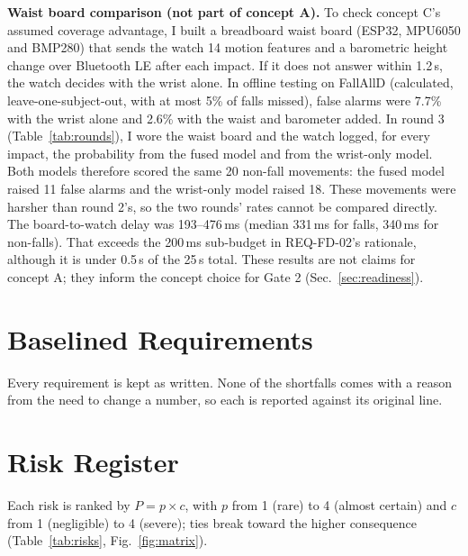\documentclass[conference]{IEEEtran}
\begin{document}
\textbf{Waist board comparison (not part of concept A).} To check concept C's assumed coverage advantage, I built a breadboard waist board (ESP32, MPU6050 and BMP280) that sends the watch 14 motion features and a barometric height change over Bluetooth LE after each impact. If it does not answer within 1.2\,s, the watch decides with the wrist alone. In offline testing on FallAllD (calculated, leave-one-subject-out, with at most 5\% of falls missed), false alarms were 7.7\% with the wrist alone and 2.6\% with the waist and barometer added. In round 3 (Table~\ref{tab:rounds}), I wore the waist board and the watch logged, for every impact, the probability from the fused model and from the wrist-only model. Both models therefore scored the same 20 non-fall movements: the fused model raised 11 false alarms and the wrist-only model raised 18. These movements were harsher than round 2's, so the two rounds' rates cannot be compared directly. The board-to-watch delay was 193--476\,ms (median 331\,ms for falls, 340\,ms for non-falls). That exceeds the 200\,ms sub-budget in REQ-FD-02's rationale, although it is under 0.5\,s of the 25\,s total. These results are not claims for concept A; they inform the concept choice for Gate 2 (Sec.~\ref{sec:readiness}).

\section{Baselined Requirements}
\label{sec:baseline}

Every requirement is kept as written. None of the shortfalls comes with a reason from the need to change a number, so each is reported against its original line.



\section{Risk Register}
\label{sec:risks}

Each risk is ranked by $P = p \times c$, with $p$ from 1 (rare) to 4 (almost certain) and $c$ from 1 (negligible) to 4 (severe); ties break toward the higher consequence (Table~\ref{tab:risks}, Fig.~\ref{fig:matrix}).


\end{document}
